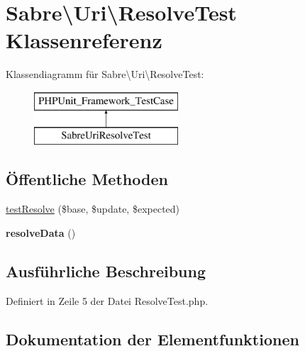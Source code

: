 \hypertarget{class_sabre_1_1_uri_1_1_resolve_test}{}\section{Sabre\textbackslash{}Uri\textbackslash{}Resolve\+Test Klassenreferenz}
\label{class_sabre_1_1_uri_1_1_resolve_test}
Klassendiagramm für Sabre\textbackslash{}Uri\textbackslash{}Resolve\+Test\+:\begin{figure}[H]
\begin{center}
\leavevmode
\includegraphics[height=2.000000cm]{class_sabre_1_1_uri_1_1_resolve_test}
\end{center}
\end{figure}
\subsection*{Öffentliche Methoden}
\begin{DoxyCompactItemize}
\item 
\mbox{\hyperlink{class_sabre_1_1_uri_1_1_resolve_test_af531502dbb37607f8bb183731c3e2ffd}{test\+Resolve}} (\$base, \$update, \$expected)
\item 
\mbox{\label{class_sabre_1_1_uri_1_1_resolve_test_aac78b8eeaff2f421c2c11a23856bcc42}} 
{\bfseries resolve\+Data} ()
\end{DoxyCompactItemize}


\subsection{Ausführliche Beschreibung}


Definiert in Zeile 5 der Datei Resolve\+Test.\+php.



\subsection{Dokumentation der Elementfunktionen}
\mbox{\label{class_sabre_1_1_uri_1_1_resolve_test_af531502dbb37607f8bb183731c3e2ffd}} 
